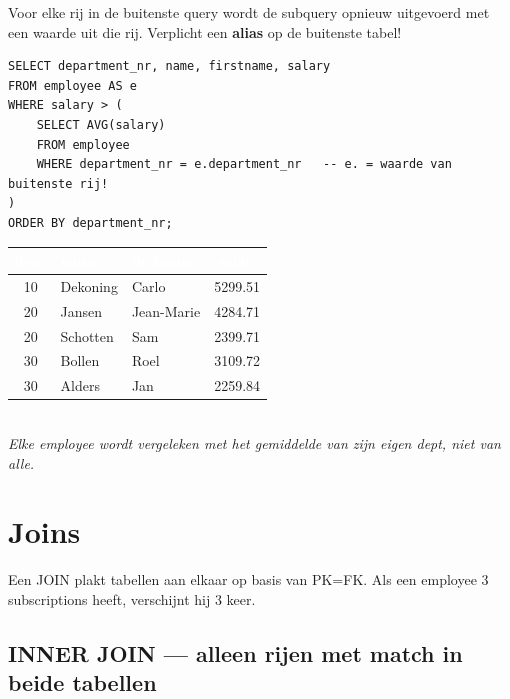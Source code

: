 \documentclass[10pt,a4paper]{article}
\newcommand{\TBLH}[1]{\textbf{\textcolor{white}{#1}}}
\begin{document}
Voor elke rij in de buitenste query wordt de subquery opnieuw uitgevoerd met een waarde uit die rij. Verplicht een \textbf{alias} op de buitenste tabel!

\begin{tcolorbox}[sqlbox,title=Employees met salary $>$ gemiddelde van hun eigen department]
\begin{lstlisting}
SELECT department_nr, name, firstname, salary
FROM employee AS e
WHERE salary > (
    SELECT AVG(salary)
    FROM employee
    WHERE department_nr = e.department_nr   -- e. = waarde van buitenste rij!
)
ORDER BY department_nr;
\end{lstlisting}
\end{tcolorbox}

\begin{tcolorbox}[resbox,title=Resultaat]
{\scriptsize\begin{tabular}{|c|l|l|r|}
\hline
\rowcolor{tblhead}\TBLH{dept} & \TBLH{name} & \TBLH{firstname} & \TBLH{salary} \\ \hline
10 & Dekoning & Carlo      & 5299.51 \\ \hline
\rowcolor{rowalt}
20 & Jansen   & Jean-Marie & 4284.71 \\ \hline
20 & Schotten & Sam        & 2399.71 \\ \hline
\rowcolor{rowalt}
30 & Bollen   & Roel       & 3109.72 \\ \hline
30 & Alders   & Jan        & 2259.84 \\ \hline
\end{tabular}}\\[2pt]
\textit{Elke employee wordt vergeleken met het gemiddelde van zijn eigen dept, niet van alle.}
\end{tcolorbox}

\section{Joins}

Een JOIN plakt tabellen aan elkaar op basis van PK=FK. Als een employee 3 subscriptions heeft, verschijnt hij 3 keer.

\subsection{INNER JOIN --- alleen rijen met match in beide tabellen}
\end{document}
